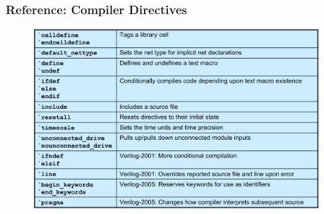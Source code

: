 \documentclass[t, notes, xcolor=table]{beamer}
\begin{document}
\begin{frame}
\frametitle{Reference: Compiler Directives}
\begin{figure}
    \includegraphics[width=0.95\textwidth]{img/11_reference.png}
\end{figure}
\end{frame}
\end{document}

